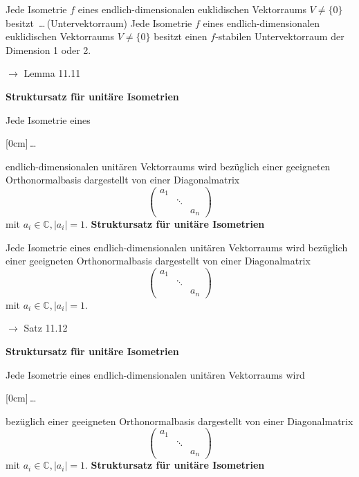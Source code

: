 \documentclass[11pt]{article}
\renewcommand{\cite}[1]{\par\bigskip\hfill{\color{gray}\tiny\(\to\) #1}}
\newcommand{\CC}{\mathbb{C}}
\newcommand{\hide}[1]{\parbox{0cm}{\raisebox{-7pt}[0cm]{\dots}}\color{white}#1\color{black}}
\newcommand{\hint}[1]{{\color{lightgray}(#1)}}
\let\olddots\dots
\renewcommand{\dots}{\,\olddots\,}
\newenvironment{field}{}{\newpage}
\newif\ifnote
\newenvironment{note}{\notetrue}{\notefalse}
\newcommand{\localtag}{}
\newcommand{\globaltag}{}
\newcommand{\uuid}{}
\newcommand{\tags}[1]{
    \ifnote
        \renewcommand{\localtag}{#1}
    \else
        \renewcommand{\globaltag}{#1}
    \fi
    }
\newcommand{\xplain}[1]{\renewcommand{\uuid}{#1}}
\begin{document}

\begin{note}
    \tags{Lemma}
    \xplain{e16fae78-c78b-11ec-9d64-0242ac120002}

    \begin{field}
        Jede Isometrie $f$ eines endlich-dimensionalen euklidischen Vektorraums $V\neq \{ 0\}$ besitzt \dots \hint{Untervektorraum}
    \end{field}
    \begin{field}
        Jede Isometrie $f$ eines endlich-dimensionalen euklidischen Vektorraums $V\neq \{ 0\}$ besitzt einen $f$-stabilen Untervektorraum der Dimension 1 oder 2.
        \cite{Lemma 11.11}
    \end{field}
\end{note}
\begin{note}
    \tags{Satz}
    \xplain{950750fa-c78a-11ec-9d64-0242ac120002}
    \begin{field}
        \textbf{Struktursatz für unitäre Isometrien}

        Jede Isometrie eines \hide{endlich-dimensionalen} unitären Vektorraums wird bezüglich einer geeigneten Orthonormalbasis dargestellt von einer Diagonalmatrix
        \[\begin{pmatrix}
             a_1 \\
            &\ddots\\
            &&a_n
        \end{pmatrix}\]
        mit $a_i \in \CC, \vert a_i \vert = 1$.
    \end{field}
    \begin{field}
        \textbf{Struktursatz für unitäre Isometrien}

        Jede Isometrie eines endlich-dimensionalen unitären Vektorraums wird bezüglich einer geeigneten Orthonormalbasis dargestellt von einer Diagonalmatrix
        \[\begin{pmatrix}
             a_1 \\
            &\ddots\\
            &&a_n
        \end{pmatrix}\]
        mit $a_i \in \CC, \vert a_i \vert = 1$.
        \cite{Satz 11.12}
    \end{field}

    \begin{field}
        \textbf{Struktursatz für unitäre Isometrien}

        Jede Isometrie eines endlich-dimensionalen unitären Vektorraums wird \hide{bezüglich einer geeigneten Orthonormalbasis} dargestellt von einer Diagonalmatrix
        \[\begin{pmatrix}
             a_1 \\
            &\ddots\\
            &&a_n
        \end{pmatrix}\]
        mit $a_i \in \CC, \vert a_i \vert = 1$.
    \end{field}
    \begin{field}
        \textbf{Struktursatz für unitäre Isometrien}


\end{field}
\end{note}
\end{document}
